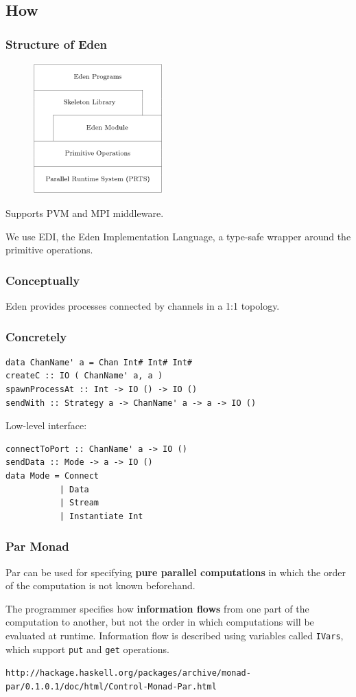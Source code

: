 \documentclass[12pt, danish]{beamer}
\begin{document}
\subsection{How}

\begin{frame}
\frametitle{Structure of Eden}

\begin{figure}
\includegraphics[width=5cm]{edenstructure.png}
\end{figure}

Supports PVM and MPI middleware.

We use EDI, the Eden Implementation Language, a type-safe wrapper
around the primitive operations.
\end{frame}

\begin{frame}
\frametitle{Conceptually}

Eden provides processes connected by channels in a 1:1 topology.
\end{frame}

\begin{frame}[fragile]
\frametitle{Concretely}

\begin{verbatim}
data ChanName' a = Chan Int# Int# Int#
createC :: IO ( ChanName' a, a )
spawnProcessAt :: Int -> IO () -> IO ()
sendWith :: Strategy a -> ChanName' a -> a -> IO ()
\end{verbatim}
\pause
Low-level interface:
\begin{verbatim}
connectToPort :: ChanName' a -> IO ()
sendData :: Mode -> a -> IO ()
data Mode = Connect
           | Data
           | Stream
           | Instantiate Int
\end{verbatim}

\end{frame}

\begin{frame}
  \frametitle{Par Monad}
  Par can be used for specifying \textbf{pure parallel computations} in which the order of the computation is not known beforehand. \newline
  
  The programmer specifies how \textbf{information flows} from one part of the computation to another, but not the order in which computations will be evaluated at runtime. Information flow is described using variables called \texttt{IVars}, which support \texttt{put} and \texttt{get} operations. \newline 
  
  \tiny{\texttt{http://hackage.haskell.org/packages/archive/monad-par/0.1.0.1/doc/html/Control-Monad-Par.html}}
\end{frame}
\end{document}
